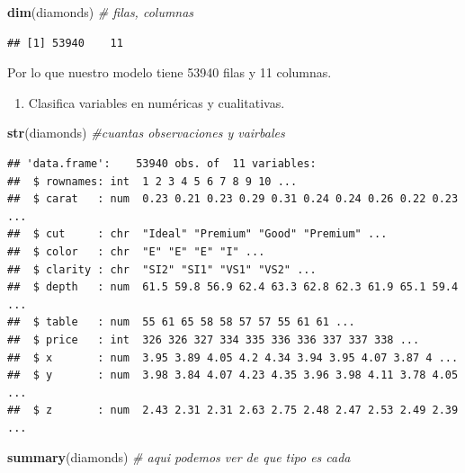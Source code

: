 \documentclass[
  spanish,
]{article}
\newenvironment{Shaded}{\begin{snugshade}}{\end{snugshade}}
\newcommand{\CommentTok}[1]{\textcolor[rgb]{0.56,0.35,0.01}{\textit{#1}}}
\newcommand{\FunctionTok}[1]{\textcolor[rgb]{0.13,0.29,0.53}{\textbf{#1}}}
\newcommand{\NormalTok}[1]{#1}
\providecommand{\tightlist}{%
  \setlength{\itemsep}{0pt}\setlength{\parskip}{0pt}}
\begin{document}
\begin{Shaded}
\begin{Highlighting}[]
\FunctionTok{dim}\NormalTok{(diamonds)        }\CommentTok{\# filas, columnas}
\end{Highlighting}
\end{Shaded}

\begin{verbatim}
## [1] 53940    11
\end{verbatim}

Por lo que nuestro modelo tiene 53940 filas y 11 columnas.

\begin{enumerate}
\def\labelenumi{\arabic{enumi}.}
\setcounter{enumi}{1}
\tightlist
\item
  Clasifica variables en numéricas y cualitativas.
\end{enumerate}

\begin{Shaded}
\begin{Highlighting}[]
\FunctionTok{str}\NormalTok{(diamonds)   }\CommentTok{\#cuantas observaciones y vairbales     }
\end{Highlighting}
\end{Shaded}

\begin{verbatim}
## 'data.frame':    53940 obs. of  11 variables:
##  $ rownames: int  1 2 3 4 5 6 7 8 9 10 ...
##  $ carat   : num  0.23 0.21 0.23 0.29 0.31 0.24 0.24 0.26 0.22 0.23 ...
##  $ cut     : chr  "Ideal" "Premium" "Good" "Premium" ...
##  $ color   : chr  "E" "E" "E" "I" ...
##  $ clarity : chr  "SI2" "SI1" "VS1" "VS2" ...
##  $ depth   : num  61.5 59.8 56.9 62.4 63.3 62.8 62.3 61.9 65.1 59.4 ...
##  $ table   : num  55 61 65 58 58 57 57 55 61 61 ...
##  $ price   : int  326 326 327 334 335 336 336 337 337 338 ...
##  $ x       : num  3.95 3.89 4.05 4.2 4.34 3.94 3.95 4.07 3.87 4 ...
##  $ y       : num  3.98 3.84 4.07 4.23 4.35 3.96 3.98 4.11 3.78 4.05 ...
##  $ z       : num  2.43 2.31 2.31 2.63 2.75 2.48 2.47 2.53 2.49 2.39 ...
\end{verbatim}

\begin{Shaded}
\begin{Highlighting}[]
\FunctionTok{summary}\NormalTok{(diamonds) }\CommentTok{\# aqui podemos ver de que tipo es cada}
\end{Highlighting}
\end{Shaded}
\end{document}
